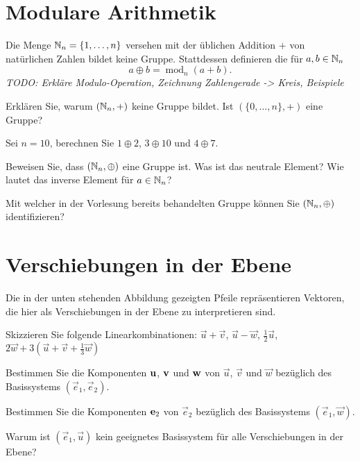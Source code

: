 \documentclass{scrartcl}
\renewcommand{\mod}{\operatorname{mod}}
\newcommand{\uu}{\vec{u}}
\newcommand{\vv}{\vec{v}}
\newcommand{\ww}{\vec{w}}
\newcommand{\ee}{\vec{e}}
\begin{document}
\section{Modulare Arithmetik}
Die Menge $\mathbb{N}_n = \{1,\ldots,n\}$ versehen mit der üblichen Addition $+$ von natürlichen Zahlen bildet keine Gruppe.
Stattdessen definieren die  für $a, b \in \mathbb{N}_n$
\[
a \oplus b = \mod_n(a + b).
\]
\emph{TODO: Erkläre Modulo-Operation, Zeichnung Zahlengerade -> Kreis, Beispiele}
\begin{subex}
  \item Erklären Sie, warum $(\mathbb{N}_n, +)$ keine Gruppe bildet.
  Ist $(\{0, \ldots, n\},+)$ eine Gruppe?
  \item Sei $n=10$, berechnen Sie $1 \oplus 2$, $3 \oplus 10$ und $4 \oplus 7$.
  \item Beweisen Sie, dass $(\mathbb{N}_n,\oplus)$ eine Gruppe ist.
  Was ist das neutrale Element?
  Wie lautet das inverse Element für $a\in\mathbb{N}_n$?
  \item Mit welcher in der Vorlesung bereits behandelten Gruppe können Sie $(\mathbb{N}_n,\oplus)$ identifizieren?
\end{subex}


\section{Verschiebungen in der Ebene}
Die in der unten stehenden Abbildung gezeigten Pfeile repräsentieren Vektoren, die hier als Verschiebungen in der Ebene zu interpretieren sind.
\begin{subex}
  \item Skizzieren Sie folgende Linearkombinationen: $\uu + \vv$, $\uu - \ww$, $\frac{1}{2}\uu$, $2\ww + 3(\uu + \vv + \frac{1}{3}\ww)$
  \item Bestimmen Sie die Komponenten $\mathbf{u}$, $\mathbf{v}$ und $\mathbf{w}$ von $\uu$, $\vv$ und $\ww$ bezüglich des Basissystems $(\ee_1, \ee_2)$.
  \item Bestimmen Sie die Komponenten $\mathbf{e}_2$ von $\ee_2$ bezüglich des Basissystems $(\ee_1, \ww)$.
  \item Warum ist $(\ee_1, \uu)$ kein geeignetes Basissystem für alle Verschiebungen in der Ebene? 
\end{subex}
\begin{center}
\end{center}
\end{document}
